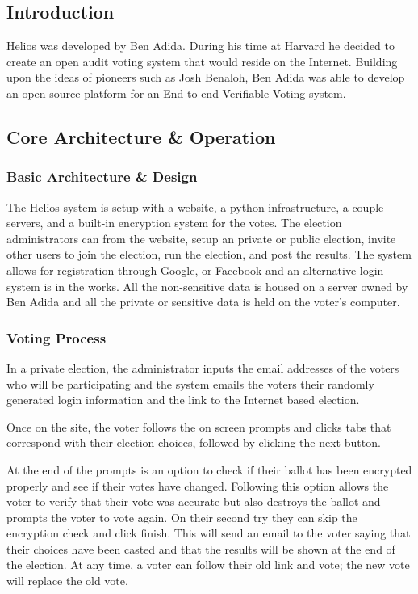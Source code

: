 \subsection{Introduction}

Helios was developed by Ben Adida. During his time at Harvard he decided to create an open audit voting system that would reside on the Internet. Building upon the ideas of pioneers such as Josh Benaloh, Ben Adida was able to develop an open source platform for an End-to-end Verifiable Voting system.

\subsection{Core Architecture \& Operation}

\subsubsection{Basic Architecture \& Design}

The Helios system is setup with a website, a python infrastructure, a couple servers, and a built-in encryption system for the votes. The election administrators can from the website, setup an private or public election, invite other users to join the election, run the election, and post the results. The system allows for registration through Google, or Facebook and an alternative login system is in the works. All the non-sensitive data is housed on a server owned by Ben Adida and all the private or sensitive data is held on the voter's computer.

\subsubsection{Voting Process}

In a private election, the administrator inputs the email addresses of the voters who will be participating and the system emails the voters their randomly generated login information and the link to the Internet based election.

Once on the site, the voter follows the on screen prompts and clicks tabs that correspond with their election choices, followed by clicking the next button.

At the end of the prompts is an option to check if their ballot has been encrypted properly and see if their votes have changed. Following this option allows the voter to verify that their vote was accurate but also destroys the ballot and prompts the voter to vote again. On their second try they can skip the encryption check and click finish. This will send an email to the voter saying that their choices have been casted and that the results will be shown at the end of the election. At any time, a voter can follow their old link and vote; the new vote will replace the old vote.

